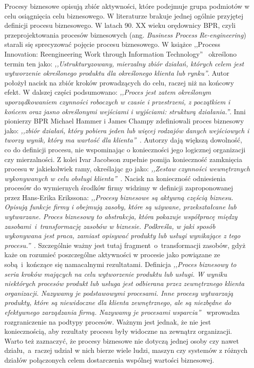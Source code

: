 Procesy biznesowe opisują zbiór aktywności, które podejmuje grupa podmiotów w celu osiągnięcia celu biznesowego. W literaturze brakuje jednej ogólnie przyjętej definicji procesu biznesowego. W latach 90. XX wieku orędownicy BPR, czyli przeprojektowania procesów biznesowych (ang. \textit{Business Process Re-engineering}) starali się sprecyzować pojęcie procesu biznesowego. W książce ,,Process Innovation: Reengineering Work through Information Technology''~\cite{davenport1993process} określono termin ten jako: \textit{,,Ustrukturyzowany, mierzalny zbiór działań, których celem jest wytworzenie określonego produktu dla określonego klienta lub rynku''}. Autor położył nacisk na zbiór kroków prowadzących do celu, raczej niż na końcowy efekt. W dalszej części podsumowano: \textit{,,Proces jest zatem określonym uporządkowaniem czynności roboczych w czasie i przestrzeni, z początkiem i końcem oraz jasno określonymi wejściami i wyjściami: strukturą działania.''}. Inni pionierzy BPR Michael Hammer i James Champy zdefiniowali proces biznesowy jako: \textit{,,zbiór działań, który pobiera jeden lub więcej rodzajów danych wejściowych i tworzy wynik, który ma wartość dla klienta''}~\cite{HAMMER199390}. Autorzy dają większą dowolność, co do definicji procesu, nie wspominając o konieczności jego logicznej organizacji czy mierzalności. Z kolei Ivar Jacobson zupełnie pomija konieczność zamknięcia procesu w jakiekolwiek ramy, określając go jako: \textit{,,Zestaw czynności wewnętrznych wykonywanych w celu obsługi klienta''}~\cite{JacobsonObjectAdvantage}. Nacisk na konieczność odniesienia procesów do wymiernych środków firmy widzimy w definicji zaproponowanej przez Hans-Erika Erikssona: \textit{,,Procesy biznesowe są aktywną częścią biznesu. Opisują funkcje firmy i obejmują zasoby, które są używane, przekształcane lub wytwarzane. Proces biznesowy to abstrakcja, która pokazuje współpracę między zasobami~i~transformację zasobów w biznesie. Podkreśla, w jaki sposób wykonywana jest praca, zamiast opisywać produkty lub usługi wynikające z tego procesu.''}~\cite{Eriksson2000BusinessMW}. Szczególnie ważny jest tutaj fragment~o~transformacji zasobów, gdyż każe on rozumieć poszczególne aktywności w procesie jako powiązane ze sobą~i~kończące się namacalnymi rezultatami. Definicja \textit{,,Proces biznesowy to seria kroków mających na celu wytworzenie produktu lub usługi. W wyniku niektórych procesów produkt lub usługa jest odbierana przez zewnętrznego klienta organizacji. Nazywamy je podstawowymi procesami. Inne procesy wytwarzają produkty, które są niewidoczne dla klienta zewnętrznego, ale są niezbędne do efektywnego zarządzania firmą. Nazywamy je procesami wsparcia''}~\cite{rummler_brache_1995} wprowadza rozgraniczenie na podtypy procesów. Ważnym jest jednak, że nie jest koniecznością, aby rezultaty procesu były widoczne na zewnątrz organizacji. Warto też zaznaczyć, że procesy biznesowe nie dotyczą jednej osoby czy nawet działu,~a~raczej udział w nich bierze wiele ludzi, maszyn czy systemów z różnych działów połączonych celem dostarczenia wspólnej wartości biznesowej.

